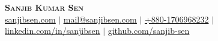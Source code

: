 
\begin{center}
    \textbf{\Huge \scshape Sanjib Kumar Sen} \\ \vspace{1pt}
    \href{https://sanjibsen.com}{\underline{sanjibsen.com}} $|$
    \href{mailto:mail@sanjibsen.com}{\underline{mail@sanjibsen.com}} $|$
    \href{tel:+8801706968232}{+880-1706968232} $|$
    \href{https://linkedin.com/in/sanjibsen}{\underline{linkedin.com/in/sanjibsen}} $|$
    \href{https://github.com/sanjib-sen}{\underline{github.com/sanjib-sen}} \\
\end{center}